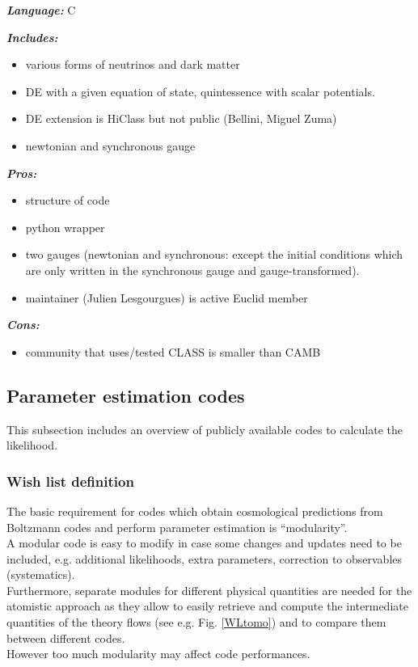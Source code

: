 {\it \bf  Language:} C

{\it \bf Includes:}
\begin{itemize}
 \item various forms of neutrinos and dark matter
 \item DE with a given equation of state, quintessence with scalar potentials.
 \item DE extension is HiClass but not public (Bellini, Miguel Zuma)
 \item newtonian and synchronous gauge
\end{itemize}

{\it \bf Pros: }
\begin{itemize}
 \item structure of code
 \item python wrapper
 \item two gauges (newtonian and synchronous: except the initial conditions which are only written in the synchronous gauge and gauge-transformed). 
 \item maintainer (Julien Lesgourgues) is active Euclid member
\end{itemize}

{\it \bf Cons: }
\begin{itemize}
 \item community that uses/tested CLASS is smaller than CAMB
\end{itemize}


\newpage

\subsection{Parameter estimation codes}
This subsection includes an overview of publicly available codes to calculate the likelihood.

\subsubsection{Wish list definition}

The basic requirement for codes which obtain cosmological predictions from Boltzmann codes and perform parameter estimation is ``modularity''.\\
A modular code is easy to modify in case some changes and updates need to be included, e.g. additional likelihoods, extra parameters, correction to observables (systematics).\\
Furthermore, separate modules for different physical quantities are needed for the atomistic approach as they allow to easily retrieve and compute the intermediate quantities of the theory
flows (see e.g. Fig. \ref{WLtomo}) and to compare them between different codes.\\
However too much modularity may affect code performances.\\

